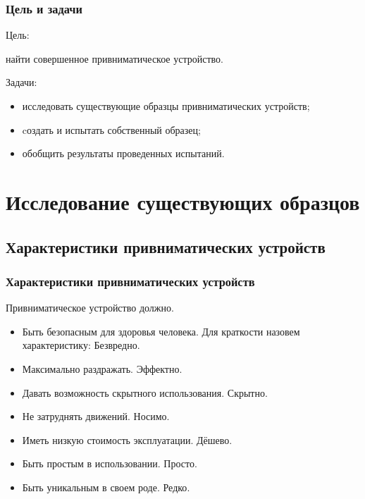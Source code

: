     
\begin{frame}
    \frametitle{Цель и задачи}
    
    \begin{block}{Цель:}
        \begin{center}
            найти \alert{совершенное} привниматическое устройство.
        \end{center}
    \end{block}
    
    \par\bigskip
    
    \begin{block}{Задачи:}
        \begin{itemize}
            \item исследовать существующие образцы привниматических устройств; 
            \item cоздать и испытать собственный образец;
            \item обобщить результаты проведенных испытаний.
        \end{itemize}
    \end{block}
\end{frame}


\section{Исследование существующих образцов}

\subsection{Характеристики привниматических устройств}

\begin{frame}
    \frametitle{Характеристики привниматических устройств}
    
    Привниматическое устройство должно.
    \begin{itemize}
        \item Быть безопасным для здоровья человека. Для краткости назовем характеристику: \alert{Безвредно}.
        
        \item Максимально раздражать. \alert{Эффектно}.  
        
        \item Давать возможность скрытного использования. \alert{Скрытно}.  
        
        \item Не затруднять движений. \alert{Носимо}.
        
        \item Иметь низкую стоимость эксплуатации. \alert{Дёшево}. 
        
        \item Быть простым в использовании. \alert{Просто}.

        \item Быть уникальным в своем роде. \alert{Редко}.
    \end{itemize}
\end{frame}

